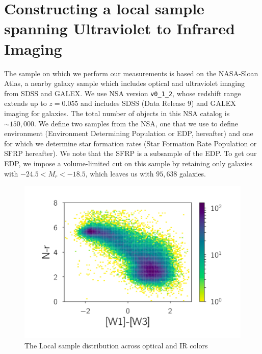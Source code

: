 \section{Constructing a local sample spanning Ultraviolet to Infrared Imaging}
The sample on which we perform our measurements is based on the NASA-Sloan Atlas, a nearby galaxy sample which includes optical and ultraviolet imaging from SDSS and GALEX. We use NSA version {\tt v0\_1\_2}, whose redshift range extends up to $z = 0.055$ and includes SDSS (Data Release $9$) and GALEX imaging for galaxies. The total number of objects in this NSA catalog is ${\sim}150,000$. We define two samples from the NSA, one that we use to define environment (Environment Determining Population or EDP, hereafter) and one for which we determine star formation rates (Star Formation Rate Population or SFRP hereafter). We note that the SFRP is a subsample of the EDP. To get our EDP, we impose a volume-limited cut on this sample by retaining only galaxies with $-24.5 <M_{r}< -18.5$, which leaves us with $95,638$ galaxies.\\

\begin{figure}
\includegraphics[width=\textwidth]{figures/sample}
\caption[Short figure name.]{The Local sample distribution across optical and IR colors
\label{fig:myInlineFigure}}
\end{figure}

